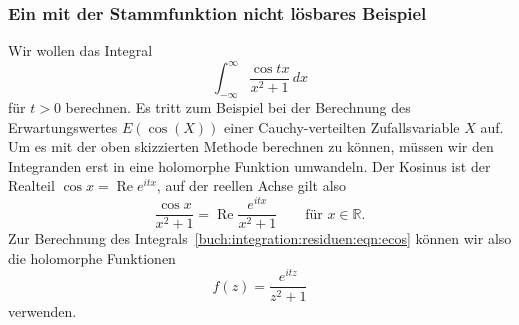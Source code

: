 %
%
\subsubsection{Ein mit der Stammfunktion nicht lösbares Beispiel}
Wir wollen das Integral
\begin{equation}
\int_{-\infty}^\infty
\frac{\cos tx}{x^2+1}
\,dx
\label{buch:integration:residuen:eqn:ecos}
\end{equation}
für $t>0$ berechnen.
Es tritt zum Beispiel bei der Berechnung des Erwartungswertes 
$E(\cos(X))$ einer Cauchy-verteilten Zufallsvariable $X$ auf.
Um es mit der oben skizzierten Methode berechnen zu können,
müssen wir den Integranden erst in eine holomorphe Funktion
umwandeln.
Der Kosinus ist der Realteil $\cos x = \operatorname{Re}e^{itx}$,
auf der reellen Achse gilt also
\[
\frac{\cos x}{x^2+1}
=
\operatorname{Re}\frac{e^{itx}}{x^2+1}
\qquad
\text{für $x\in\mathbb{R}$}.
\]
Zur Berechnung des Integrals~\eqref{buch:integration:residuen:eqn:ecos}
können wir also die holomorphe Funktionen
\begin{equation}
f(z)
=
\frac{e^{itz}}{z^2+1}
\end{equation}
verwenden.

